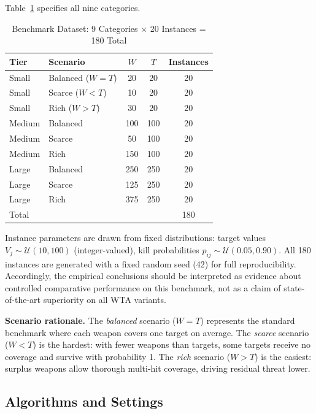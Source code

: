 \documentclass[10pt,conference]{IEEEtran}
\begin{document}
Table~\ref{tab:dataset} specifies all nine categories.

\begin{table}[htbp]
  \caption{Benchmark Dataset: 9 Categories $\times$ 20 Instances = 180 Total}
  \label{tab:dataset}
  \centering
  \small
  \begin{tabular}{llccc}
    \toprule
    Tier   & Scenario             & $W$ & $T$ & Instances \\
    \midrule
    Small  & Balanced ($W = T$)  & 20  & 20  & 20 \\
    Small  & Scarce ($W < T$)    & 10  & 20  & 20 \\
    Small  & Rich ($W > T$)      & 30  & 20  & 20 \\
    \midrule
    Medium & Balanced            & 100 & 100 & 20 \\
    Medium & Scarce              & 50  & 100 & 20 \\
    Medium & Rich                & 150 & 100 & 20 \\
    \midrule
    Large  & Balanced            & 250 & 250 & 20 \\
    Large  & Scarce              & 125 & 250 & 20 \\
    Large  & Rich                & 375 & 250 & 20 \\
    \bottomrule
    \multicolumn{3}{l}{Total} && 180 \\
  \end{tabular}
\end{table}

Instance parameters are drawn from fixed distributions:
target values $V_j \sim \mathcal{U}(10, 100)$ (integer-valued),
kill probabilities $p_{ij} \sim \mathcal{U}(0.05, 0.90)$.
All 180 instances are generated with a fixed random seed (42) for full
reproducibility.
Accordingly, the empirical conclusions should be interpreted as evidence about
controlled comparative performance on this benchmark, not as a claim of
state-of-the-art superiority on all WTA variants.

\textbf{Scenario rationale.}
The \emph{balanced} scenario ($W = T$) represents the standard benchmark where
each weapon covers one target on average.
The \emph{scarce} scenario ($W < T$) is the hardest: with fewer weapons than
targets, some targets receive no coverage and survive with probability 1.
The \emph{rich} scenario ($W > T$) is the easiest: surplus weapons allow
thorough multi-hit coverage, driving residual threat lower.

\subsection{Algorithms and Settings}
\end{document}

